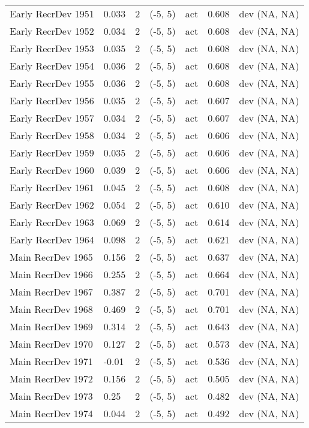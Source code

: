 \documentclass[11pt,
  english,
  letterpaper,
]{article}
\begin{document}
\begin{landscape}
\begin{longtable}[t]{>{\raggedright\arraybackslash}p{7.5cm}lllll>{\raggedright\arraybackslash}p{3.5cm}}
Early RecrDev 1951 & 0.033 & 2 & (-5, 5) & act & 0.608 & dev (NA, NA)\\
Early RecrDev 1952 & 0.034 & 2 & (-5, 5) & act & 0.608 & dev (NA, NA)\\
Early RecrDev 1953 & 0.035 & 2 & (-5, 5) & act & 0.608 & dev (NA, NA)\\
Early RecrDev 1954 & 0.036 & 2 & (-5, 5) & act & 0.608 & dev (NA, NA)\\
Early RecrDev 1955 & 0.036 & 2 & (-5, 5) & act & 0.608 & dev (NA, NA)\\
Early RecrDev 1956 & 0.035 & 2 & (-5, 5) & act & 0.607 & dev (NA, NA)\\
Early RecrDev 1957 & 0.034 & 2 & (-5, 5) & act & 0.607 & dev (NA, NA)\\
Early RecrDev 1958 & 0.034 & 2 & (-5, 5) & act & 0.606 & dev (NA, NA)\\
Early RecrDev 1959 & 0.035 & 2 & (-5, 5) & act & 0.606 & dev (NA, NA)\\
Early RecrDev 1960 & 0.039 & 2 & (-5, 5) & act & 0.606 & dev (NA, NA)\\
Early RecrDev 1961 & 0.045 & 2 & (-5, 5) & act & 0.608 & dev (NA, NA)\\
Early RecrDev 1962 & 0.054 & 2 & (-5, 5) & act & 0.610 & dev (NA, NA)\\
Early RecrDev 1963 & 0.069 & 2 & (-5, 5) & act & 0.614 & dev (NA, NA)\\
Early RecrDev 1964 & 0.098 & 2 & (-5, 5) & act & 0.621 & dev (NA, NA)\\
Main RecrDev 1965 & 0.156 & 2 & (-5, 5) & act & 0.637 & dev (NA, NA)\\
Main RecrDev 1966 & 0.255 & 2 & (-5, 5) & act & 0.664 & dev (NA, NA)\\
Main RecrDev 1967 & 0.387 & 2 & (-5, 5) & act & 0.701 & dev (NA, NA)\\
Main RecrDev 1968 & 0.469 & 2 & (-5, 5) & act & 0.701 & dev (NA, NA)\\
Main RecrDev 1969 & 0.314 & 2 & (-5, 5) & act & 0.643 & dev (NA, NA)\\
Main RecrDev 1970 & 0.127 & 2 & (-5, 5) & act & 0.573 & dev (NA, NA)\\
Main RecrDev 1971 & -0.01 & 2 & (-5, 5) & act & 0.536 & dev (NA, NA)\\
Main RecrDev 1972 & 0.156 & 2 & (-5, 5) & act & 0.505 & dev (NA, NA)\\
Main RecrDev 1973 & 0.25 & 2 & (-5, 5) & act & 0.482 & dev (NA, NA)\\
Main RecrDev 1974 & 0.044 & 2 & (-5, 5) & act & 0.492 & dev (NA, NA)\\

\end{longtable}
\end{landscape}
\end{document}
